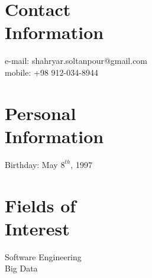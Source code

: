 \documentclass[line, mm]{sampleCV}
\begin{document}
\begin{resume}
	



    \section{\mysidestyle Contact\\Information}
    
   e-mail: shahryar.soltanpour@gmail.com\\
    mobile: +98 912-034-8944 
    
    \section{\mysidestyle Personal\\Information}
   
    Birthday: May $8^{th}$, 1997



    \section{\mysidestyle Fields of \\ Interest}
	Software Engineering\\
	Big Data

    

\end{resume}
\end{document}
